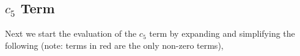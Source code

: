 \subsection{$c_{5}$ Term}
Next we start the evaluation of the $c_{5}$ term by expanding and
simplifying the following (note: terms in red are the only non-zero terms), 
